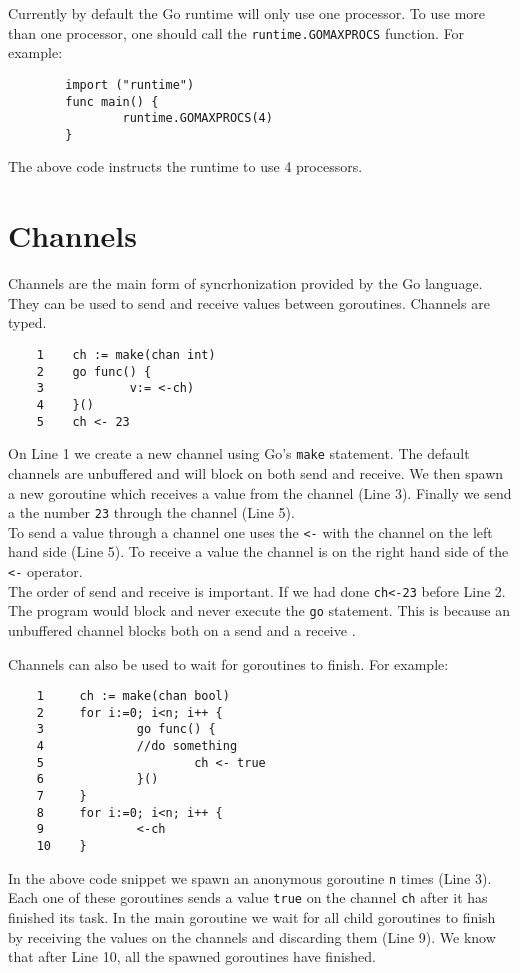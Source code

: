 \documentclass[8pt, twocolumn]{article}
\begin{document}
Currently by default the Go runtime will only use one processor. To
use more than one processor, one should call the
\verb=runtime.GOMAXPROCS= function. For example:
\begin{verbatim}
        import ("runtime")        
        func main() {
                runtime.GOMAXPROCS(4)
        }
\end{verbatim}
The above code instructs the runtime to use 4 processors.

\section{Channels}
Channels are the main form of syncrhonization provided by the Go
language. They can be used to send and receive values between
goroutines. Channels are typed.
\begin{verbatim}
    1    ch := make(chan int)                         
    2    go func() {
    3            v:= <-ch)
    4    }()
    5    ch <- 23  
\end{verbatim}
On Line 1 we create a new channel using Go's \verb=make=
statement. The default channels are unbuffered and will block on both
send and receive. We then spawn a new goroutine which receives a value
from the channel (Line 3). Finally we send a the number \verb=23=
through the channel (Line 5).\\

To send a value through a channel one uses the \verb=<-= with
the channel on the left hand side (Line 5). To receive a value the
channel is on the right hand side of the \verb=<-= operator. \\

The order of send and receive is important. If we had done
\verb=ch<-23= before Line 2. The program would block and never execute
the \verb=go= statement. This is because an unbuffered channel blocks
both on a send and a receive \cite{effectivego}.

Channels can also be used to wait for goroutines to finish. For
example:
\begin{verbatim}
    1     ch := make(chan bool)
    2     for i:=0; i<n; i++ {
    3             go func() {
    4             //do something
    5                     ch <- true
    6             }()
    7     }
    8     for i:=0; i<n; i++ {
    9             <-ch 
    10    } 
\end{verbatim}
In the above code snippet we spawn an anonymous goroutine \verb=n=
times (Line 3). Each one of these goroutines sends a value \verb=true=
on the channel \verb=ch= after it has finished its task. In the main
goroutine we wait for all child goroutines to finish by receiving the
values on the channels and discarding them (Line 9). We know that
after Line 10, all the spawned goroutines have finished.\\
\end{document}
